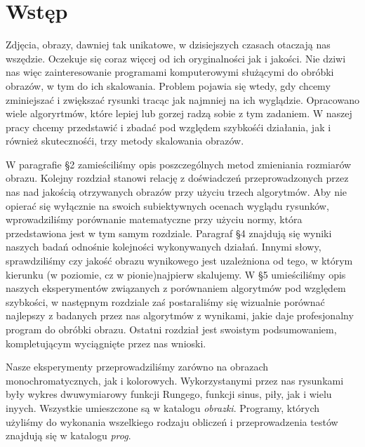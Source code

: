 \section{Wstęp}
Zdjęcia, obrazy, dawniej tak unikatowe, w dzisiejszych czasach otaczają nas
wszędzie. Oczekuje się coraz więcej od ich oryginalności jak i jakości. Nie
dziwi nas więc zainteresowanie programami komputerowymi służącymi do obróbki
obrazów, w tym do ich skalowania. Problem pojawia się wtedy, gdy chcemy zminiejszać i zwiększać
rysunki tracąc jak najmniej na ich wyglądzie. Opracowano wiele algoryrtmów,
które lepiej lub gorzej radzą sobie z tym zadaniem. W naszej pracy chcemy
przedstawić i zbadać pod względem szybkośći działania, jak i również
skutecznośći, trzy metody skalowania obrazów.

W paragrafie \S2 zamieściliśmy opis poszczególnych metod zmieniania
rozmiarów obrazu. Kolejny rozdział stanowi relację z doświadczeń
przeprowadzonych przez nas nad jakością otrzywanych obrazów przy
użyciu trzech algorytmów. Aby nie opierać się wyłącznie na swoich
subiektywnych ocenach wyglądu rysunków, wprowadziliśmy porównanie
matematyczne przy użyciu normy, która przedstawiona jest w tym samym rozdziale.
Paragraf \S4 znajdują się wyniki naszych badań odnośnie kolejności
wykonywanych działań. Innymi słowy, sprawdziliśmy czy jakość obrazu
wynikowego jest uzależniona od tego, w którym kierunku (w poziomie, cz w pionie)najpierw skalujemy.
W \S5 umieściliśmy opis naszych eksperymentów związanych z porównaniem
algorytmów pod względem szybkości, w następnym rozdziale zaś
postaraliśmy się wizualnie porównać najlepszy z badanych przez nas algorytmów
z wynikami, jakie daje profesjonalny program do obróbki obrazu. Ostatni
rozdział jest swoistym podsumowaniem, kompletującym wyciągnięte przez nas
wnioski.

Nasze eksperymenty przeprowadziliśmy zarówno na obrazach monochromatycznych,
jak i kolorowych. Wykorzystanymi przez nas rysunkami były wykres dwuwymiarowy
funkcji Rungego, funkcji sinus, piły, jak i wielu inyych. Wszystkie umieszczone są w katalogu \textit{obrazki}. Programy, których
użyliśmy do wykonania wszelkiego rodzaju obliczeń i przeprowadzenia testów znajdują się w katalogu \textit{prog}.

